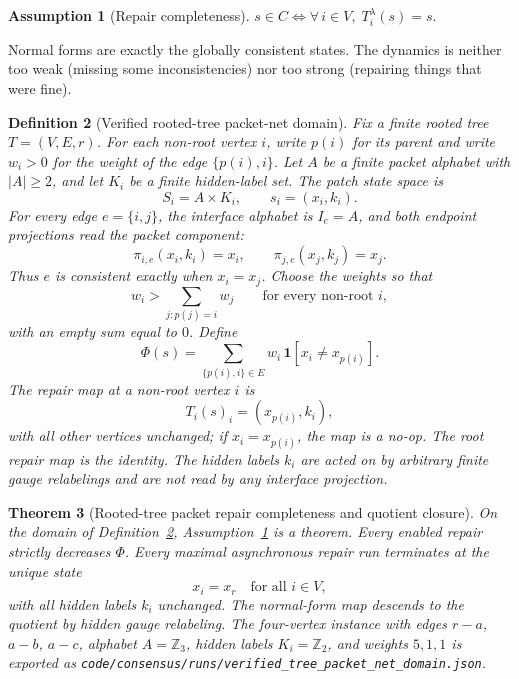 \documentclass[11pt]{article}
\newtheorem{theorem}{Theorem}[section]
\newtheorem{definition}[theorem]{Definition}
\newtheorem{assumption}[theorem]{Assumption}
\theoremstyle{remark}
\theoremstyle{plain}
\begin{document}
\begin{assumption}[Repair completeness]\label{ass:complete}
$s\in C \iff \forall\, i\in V,\; T_i^\lambda(s)=s.$
\end{assumption}

Normal forms are exactly the globally consistent states. The dynamics is neither too weak (missing some inconsistencies) nor too strong (repairing things that were fine).

\begin{definition}[Verified rooted-tree packet-net domain]\label{def:tree-packet-domain}
Fix a finite rooted tree \(T=(V,E,r)\). For each non-root vertex \(i\), write \(p(i)\) for its
parent and write \(w_i>0\) for the weight of the edge \(\{p(i),i\}\). Let \(A\) be a finite
packet alphabet with \(|A|\ge2\), and let \(K_i\) be a finite hidden-label set. The patch state
space is
\[
S_i=A\times K_i,
\qquad
s_i=(x_i,k_i).
\]
For every edge \(e=\{i,j\}\), the interface alphabet is \(I_e=A\), and both endpoint projections
read the packet component:
\[
\pi_{i,e}(x_i,k_i)=x_i,
\qquad
\pi_{j,e}(x_j,k_j)=x_j.
\]
Thus \(e\) is consistent exactly when \(x_i=x_j\). Choose the weights so that
\[
w_i>\sum_{j:p(j)=i}w_j
\qquad
\text{for every non-root } i,
\]
with an empty sum equal to \(0\). Define
\[
\Phi(s)=\sum_{\{p(i),i\}\in E}w_i\,\mathbf 1[x_i\ne x_{p(i)}].
\]
The repair map at a non-root vertex \(i\) is
\[
T_i(s)_i=(x_{p(i)},k_i),
\]
with all other vertices unchanged; if \(x_i=x_{p(i)}\), the map is a no-op. The root repair map is
the identity. The hidden labels \(k_i\) are acted on by arbitrary finite gauge relabelings and are
not read by any interface projection.
\end{definition}

\begin{theorem}[Rooted-tree packet repair completeness and quotient closure]\label{thm:tree-packet-domain}
On the domain of Definition~\ref{def:tree-packet-domain}, Assumption~\ref{ass:complete} is a
theorem. Every enabled repair strictly decreases \(\Phi\). Every maximal asynchronous repair run
terminates at the unique state
\[
x_i=x_r\quad\text{for all }i\in V,
\]
with all hidden labels \(k_i\) unchanged. The normal-form map descends to the quotient by hidden
gauge relabeling. The four-vertex instance with edges \(r\!-\!a\), \(a\!-\!b\), \(a\!-\!c\),
alphabet \(A=\mathbb Z_3\), hidden labels \(K_i=\mathbb Z_2\), and weights \(5,1,1\) is exported
as \texttt{code/consensus/runs/verified\_tree\_packet\_net\_domain.json}.
\end{theorem}
\end{document}
